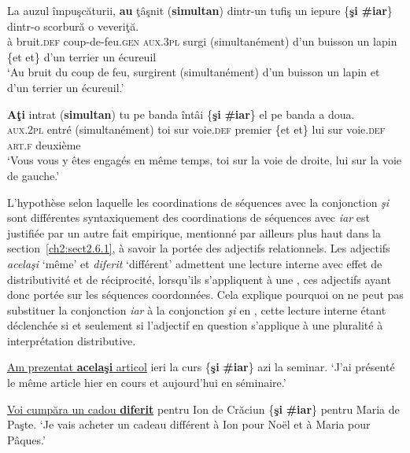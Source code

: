 \ea \label{ch2:ex308}
\ea 
\gll La  auzul  împuşcăturii,  \textbf{au}  ţâşnit  (\textbf{simultan})  dintr-un  tufiş un  iepure  \{\textbf{şi} {\textbar} \textbf{\#iar}\}  dintr-o  scorbură  o  veveriţă.\\
à  bruit.\textsc{def}  coup-de-feu.\textsc{gen}  \textsc{aux.3pl}  surgi  (simultanément)  d’un  buisson un  lapin  \{et {\textbar} et\}  d’un  terrier  un  écureuil\\
\glt ‘Au bruit du coup de feu, surgirent (simultanément) d’un buisson un lapin et d’un terrier un écureuil.’

\ex 
\gll \textbf{Aţi}  intrat  (\textbf{simultan})  tu  pe  banda  întâi  \{\textbf{şi} {\textbar} \textbf{\#iar}\} el pe banda  a  doua.\\
\textsc{aux.2pl}  entré  (simultanément)  toi  sur  voie.\textsc{def}  premier  \{et {\textbar} et\}  lui  sur voie.\textsc{def}  \textsc{art.f}  deuxième\\
\glt ‘Vous vous y êtes engagés en même temps, toi sur la voie de droite, lui sur la voie de gauche.’ 
\z
\z

L’hypothèse selon laquelle les coordinations de séquences avec la conjonction \textit{şi} sont différentes syntaxiquement des coordinations de séquences avec \textit{iar} est justifiée par un autre fait empirique, mentionné par ailleurs plus haut dans la section~\ref{ch2:sect2.6.1}, à savoir la portée des adjectifs relationnels. Les adjectifs \textit{acelaşi} ‘même’ et \textit{diferit} ‘différent’ admettent une lecture interne avec effet de distributivité et de réciprocité, lorsqu’ils s’appliquent à une  \citep{VanPeteghem2002,Carlson1987}, ces adjectifs ayant donc portée sur les séquences coordonnées. Cela explique pourquoi on ne peut pas substituer la conjonction \textit{iar} à la conjonction \textit{şi} en , cette lecture interne étant déclenchée si et seulement si l’adjectif en question s’applique à une pluralité à interprétation distributive.

\ea \label{ch2:ex309}
\ea \uline{Am prezentat \textbf{acelaşi} articol} ieri la curs \{\textbf{şi} {\textbar} \textbf{\#iar}\} azi la seminar. 
\glt ‘J’ai présenté le même article hier en cours et aujourd’hui en séminaire.’ 

\ex \uline{Voi cumpăra un cadou \textbf{diferit}} pentru Ion de Crăciun \{\textbf{şi} {\textbar} \textbf{\#iar}\} pentru Maria de Paşte. 
\glt ‘Je vais acheter un cadeau différent à Ion pour Noël et à Maria pour Pâques.’
\z
\z

